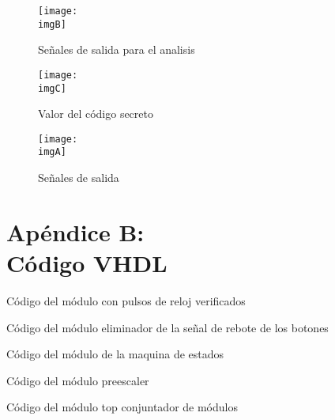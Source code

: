 \documentclass[a4paper, 12pt]{article}
\newcommand{\imgA}{img/dt1.png}
\newcommand{\imgB}{img/dt2.png}
\newcommand{\imgC}{img/secretCode.png}
\newcommand{\codeA}{code/clock_pulse.vhd}
\newcommand{\codeB}{code/debounce.vhd}
\newcommand{\codeC}{code/doorlock.vhd}
\newcommand{\codeD}{code/frequency_divider.vhd}
\newcommand{\codeE}{code/system.vhd}
\begin{document}
    \begin{figure}[H]
        \centering
        \texttt{[image: \\imgB]}
        \caption{Señales de salida para el analisis}
        \label{fig:analisis}
    \end{figure} 

    \begin{figure}[H]
        \centering
        \texttt{[image: \\imgC]}
        \caption{Valor del código secreto}
        \label{fig:secretCode}
    \end{figure} 
    
    \begin{figure}[H]
        \centering
        \texttt{[image: \\imgA]}
        \caption{Señales de salida}
        \label{fig:signal}
    \end{figure} 

    \section*{Apéndice B:\\Código VHDL}

    Código del módulo con pulsos de reloj verificados
    

    Código del módulo eliminador de la señal de rebote de los botones
    

    Código del módulo de la maquina de estados
    

    Código del módulo preescaler
    

    Código del módulo top conjuntador de módulos
    

    
\end{document}
